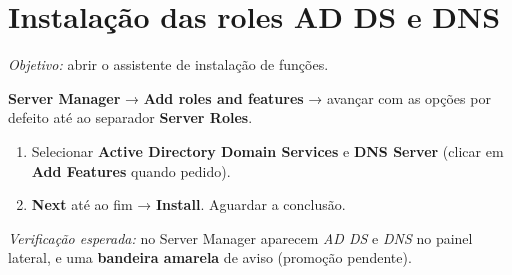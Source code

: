 
\section[Instalação das roles AD DS e DNS]{Instalação das roles AD DS e DNS}



\emph{Objetivo:} abrir o assistente de instalação de funções.

\textbf{Server Manager} → \textbf{Add roles and features} → avançar com as opções por defeito até ao separador \textbf{Server Roles}.


\begin{enumerate}
\item Selecionar \textbf{Active Directory Domain Services} e \textbf{DNS Server} (clicar em \textbf{Add Features} quando pedido).
\item \textbf{Next} até ao fim → \textbf{Install}. Aguardar a conclusão.
\end{enumerate}

\emph{Verificação esperada:} no Server Manager aparecem \emph{AD DS} e \emph{DNS} no painel lateral, e uma \textbf{bandeira amarela} de aviso (promoção pendente).

